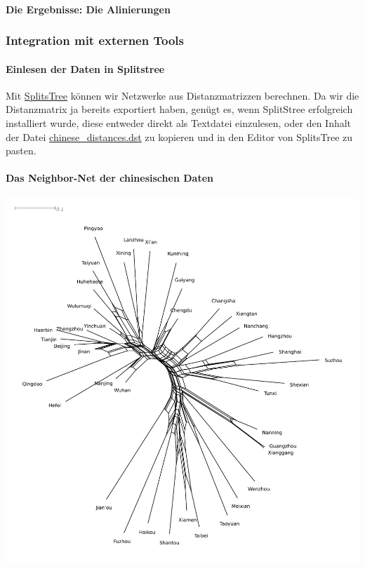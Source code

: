 \paragraph{Die Ergebnisse: Die Alinierungen}



\subsubsection{\texorpdfstring{{Integration mit externen
Tools}}{Integration mit externen Tools}}

\paragraph{Einlesen der Daten in Splitstree}

Mit \href{http://splitstree.org}{SplitsTree} können wir Netzwerke aus
Distanzmatrizzen berechnen. Da wir die Distanzmatrix ja bereits
exportiert haben, genügt es, wenn SplitStree erfolgreich installiert
wurde, diese entweder direkt als Textdatei einzulesen, oder den Inhalt
der Datei
\href{ttps://github.com/LinguList/pyjs-seminar/blob/master/website/code/data/chinese_distances.dst}{chinese\_distances.dst}
zu kopieren und in den Editor von SplitsTree zu pasten.

\paragraph{Das Neighbor-Net der chinesischen Daten}

\begin{center}
  \includegraphics{img/chinese_network.pdf}
\end{center}

